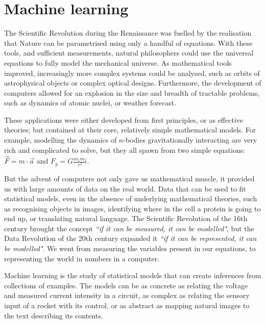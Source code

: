 \chapter{Machine learning}

The Scientific Revolution during the Renaissance 
was fuelled by the realisation that Nature can be parametrised using only a handful of equations.
With these tools, and sufficient measurements, natural philosophers could use the universal equations to fully model the mechanical universe.
As mathematical tools improved, increasingly more complex systems could be analysed, such as orbits of astrophysical objects or complex optical designs.
Furthermore, the development of computers allowed for an explosion in the size and breadth of tractable problems, such as dynamics of atomic nuclei, or weather forecast.

These applications were either developed from first principles, or as effective theories; but contained at their core, relatively simple mathematical models.
For example, modelling the dynamics of $n$-bodies gravitationally interacting are very rich and complicated to solve, but they all spawn from two simple equations: $\vec{F} = m \cdot \vec{a}$  and $F_g=G\frac{m_1  m_2}{r^2}$.

But the advent of computers not only gave us mathematical muscle, it provided us with large amounts of data on the real world.
Data that can be used to fit statistical models, even in the absence of underlying mathematical theories, such as recognising objects in images, identifying where in the cell a protein is going to end up, or translating natural language.
The Scientific Revolution of the 16th century brought the concept \emph{``if it can be measured, it can be modelled"}, but the Data Revolution of the 20th century expanded it \emph{``if it can be \emph{represented}, it can be modelled"}.
We went from measuring the variables present in our equations, to representing the world in numbers in a computer.


Machine learning 
is the study of statistical models that can create inferences from collections of examples. 
The models can be as concrete as relating the voltage and measured current intensity in a circuit, as complex as relating the sensory input of a rocket with its control, or as abstract as mapping natural images to the text describing its contents.


